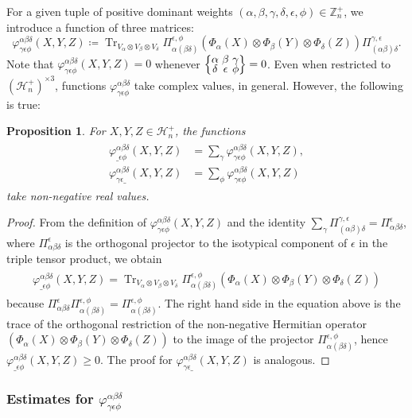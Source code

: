 \documentclass[pdflatex, sn-mathphys-num]{sn-jnl} %
\theoremstyle{plain}
\newtheorem{prop}[thm]{Proposition}
\theoremstyle{definition}
\DeclareMathOperator{\Tr}{Tr}
\newcommand{\hermp}[1]{\mathcal H^{+}_{#1}}
\newcommand{\undomweightsp}[1]{\mathbb Z^{+}_{#1}}
\newcommand{\ot}{\otimes} %
\newcommand{\vp}{\varphi} %
\newcommand{\projl}{\Pi_{(\ya \yb) \yd}^{\yc, \ye}}
\newcommand{\projr}{\Pi_{\ya (\yb \yd)}^{\ye, \yf}}
\newcommand{\ya}{\alpha}
\newcommand{\yb}{\beta}
\newcommand{\yc}{\gamma}
\newcommand{\yd}{\delta}
\newcommand{\ye}{\epsilon}
\newcommand{\yf}{\phi}
\newcommand{\tightcurlysixj}[1]{
\begingroup
\arraycolsep=1.5pt
\renewcommand{\arraystretch}{0.3}
\left\{\!\begin{array}{ccc}
    #1
\end{array}\!\right\}
\endgroup
}
\newcommand{\abcdefsymbol}{\tightcurlysixj{\alpha & \beta & \gamma \\ \delta & \epsilon & \phi}}
\begin{document}
For a given tuple of positive dominant weights $(\ya,\yb,\yc,\yd,\ye,\yf) \in \undomweightsp{n}$, we introduce a function of three matrices:
\begin{equation}
    \vp^{\ya \yb \yd}_{\yc \ye \yf}(X, Y, Z)
    \coloneqq
    \Tr_{V_\ya \ot V_\yb \ot V_\yd}
    \projr (\Phi_\ya(X) \ot \Phi_\yb(Y) \ot \Phi_\yd(Z))\projl.
\end{equation}
Note that $\vp^{\ya \yb \yd}_{\yc \ye \yf}(X,Y,Z) = 0$ whenever $\abcdefsymbol = 0$.
Even when restricted to $(\hermp{n})^{\times 3}$, functions $\vp^{\ya \yb \yd}_{\yc \ye \yf}$ take complex values, in general.
However, the following is true:
\begin{prop}
    \label{prop:non_neg_partial}
    For $X,Y,Z \in \hermp{n}$, the functions
    \begin{align}
        \begin{split}
            \vp^{\ya\yb\yd}_{\_ \ye\yf}(X,Y,Z) & = \sum_{\yc}\vp^{\ya\yb\yd}_{\yc\ye\yf}(X,Y,Z), \\
            \vp^{\ya\yb\yd}_{\yc\ye \_}(X,Y,Z) & = \sum_{\yf}\vp^{\ya\yb\yd}_{\yc\ye\yf}(X,Y,Z)
        \end{split}
    \end{align}
    take non-negative real values.
\end{prop}
\begin{proof}
    From the definition of $\vp^{\ya \yb \yd}_{\yc \ye \yf}(X, Y, Z)$ and the identity $\sum_\yc \projl = \Pi^\ye_{\ya \yb \yd}$, where $\Pi^\ye_{\ya \yb \yd}$ is the orthogonal projector to the isotypical component of $\ye$ in the triple tensor product, we obtain
    \begin{align}
        \begin{split}
            \vp^{\ya\yb\yd}_{\_ \ye\yf}(X,Y,Z)
            =
            \Tr_{V_\ya \ot V_\yb \ot V_\yd} \projr (\Phi_\ya(X) \ot \Phi_\yb(Y) \ot \Phi_\yd(Z))
        \end{split}
    \end{align}
    because $\Pi^\ye_{\ya \yb \yd} \projr = \projr$.
    The right hand side in the equation above is the trace of the orthogonal restriction of the non-negative Hermitian operator $(\Phi_\ya(X) \ot \Phi_\yb(Y) \ot \Phi_\yd(Z))$ to the image of the projector $\projr$, hence $\vp^{\ya\yb\yd}_{\_ \ye\yf}(X,Y,Z) \geq 0$.
    The proof for $\vp^{\ya\yb\yd}_{\yc\ye \_}(X,Y,Z)$ is analogous.
\end{proof}

\subsubsection{Estimates for \texorpdfstring{$\vp^{\ya \yb \yd}_{\yc \ye \yf}$}{phiabcdef}}
\end{document}
